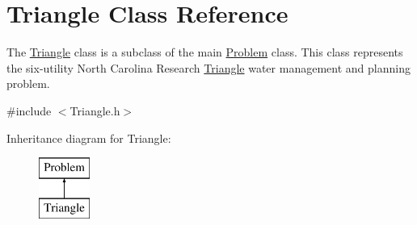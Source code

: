 \hypertarget{classTriangle}{}\section{Triangle Class Reference}
\label{classTriangle}


The {\ttfamily \mbox{\hyperlink{classTriangle}{Triangle}}} class is a subclass of the main {\ttfamily \mbox{\hyperlink{classProblem}{Problem}}} class. This class represents the six-\/utility North Carolina Research \mbox{\hyperlink{classTriangle}{Triangle}} water management and planning problem.  




{\ttfamily \#include $<$Triangle.\+h$>$}

Inheritance diagram for Triangle\+:\begin{figure}[H]
\begin{center}
\leavevmode
\includegraphics[height=2.000000cm]{classTriangle}
\end{center}
\end{figure}
